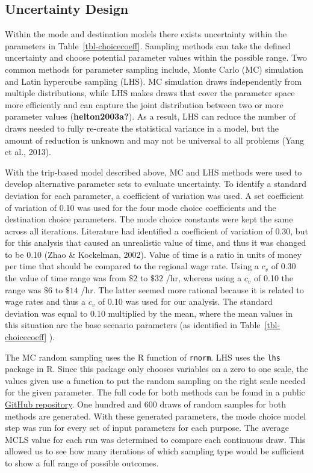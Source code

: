 \documentclass[
  letterpaper,
  number,
  review,
  3p]{elsarticle}
\begin{document}
\subsection{Uncertainty Design}\label{uncertainty-design}

Within the mode and destination models there exists uncertainty within
the parameters in Table~\ref{tbl-choicecoeff}. Sampling methods can take
the defined uncertainty and choose potential parameter values within the
possible range. Two common methods for parameter sampling include, Monte
Carlo (MC) simulation and Latin hypercube sampling (LHS). MC simulation
draws independently from multiple distributions, while LHS makes draws
that cover the parameter space more efficiently and can capture the
joint distribution between two or more parameter values
(\textbf{helton2003a?}). As a result, LHS can reduce the number of draws
needed to fully re-create the statistical variance in a model, but the
amount of reduction is unknown and may not be universal to all problems
(Yang et al., 2013).

With the trip-based model described above, MC and LHS methods were used
to develop alternative parameter sets to evaluate uncertainty. To
identify a standard deviation for each parameter, a coefficient of
variation was used. A set coefficient of variation of 0.10 was used for
the four mode choice coefficients and the destination choice parameters.
The mode choice constants were kept the same across all iterations.
Literature had identified a coefficient of variation of 0.30, but for
this analysis that caused an unrealistic value of time, and thus it was
changed to be 0.10 (Zhao \& Kockelman, 2002). Value of time is a ratio
in units of money per time that should be compared to the regional wage
rate. Using a \(c_v\) of 0.30 the value of time range was from \(\$2\)
to \(\$32\) /hr, whereas using a \(c_v\) of 0.10 the range was \(\$6\)
to \(\$14\) /hr. The latter seemed more rational because it is related
to wage rates and thus a \(c_v\) of 0.10 was used for our analysis. The
standard deviation was equal to 0.10 multiplied by the mean, where the
mean values in this situation are the base scenario parameters (as
identified in Table~\ref{tbl-choicecoeff} ).

The MC random sampling uses the R function of \texttt{rnorm}. LHS uses
the \texttt{lhs} package in R. Since this package only chooses variables
on a zero to one scale, the values given use a function to put the
random sampling on the right scale needed for the given parameter. The
full code for both methods can be found in a public
\href{https://github.com/natmaegray/sensitivity_thesis}{GitHub
repository}. One hundred and 600 draws of random samples for both
methods are generated. With these generated parameters, the mode choice
model step was run for every set of input parameters for each purpose.
The average MCLS value for each run was determined to compare each
continuous draw. This allowed us to see how many iterations of which
sampling type would be sufficient to show a full range of possible
outcomes.
\end{document}
